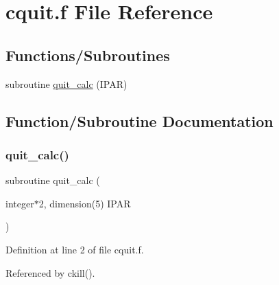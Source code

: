 \hypertarget{cquit_8f}{}\section{cquit.\+f File Reference}
\label{cquit_8f}
\subsection*{Functions/\+Subroutines}
\begin{DoxyCompactItemize}
\item 
subroutine \hyperlink{cquit_8f_a6bfcacec437ac66e5904788e45cd279d}{quit\+\_\+calc} (I\+P\+AR)
\end{DoxyCompactItemize}


\subsection{Function/\+Subroutine Documentation}
\mbox{\label{cquit_8f_a6bfcacec437ac66e5904788e45cd279d}} 
\subsubsection{\texorpdfstring{quit\+\_\+calc()}{quit\_calc()}}
{\footnotesize\ttfamily subroutine quit\+\_\+calc (\begin{DoxyParamCaption}\item[{integer$\ast$2, dimension(5)}]{I\+P\+AR }\end{DoxyParamCaption})}



Definition at line 2 of file cquit.\+f.



Referenced by ckill().

